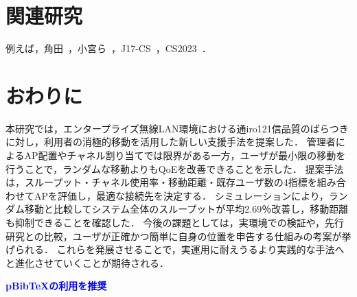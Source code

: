 \documentclass[dvipdfmx,twocolumn]{jsarticle}
\newcommand{\Note}[1]{\noindent \textbf{\textcolor{blue}{#1}}}
\begin{document}

\section{関連研究}
例えば，角田~\cite{角田24}，小宮ら~\cite{小宮24}，J17-CS~\cite{ipsj-csec18:J17-CS}，CS2023~\cite{kumar24:CS2023}．

\section{おわりに}
本研究では，エンタープライズ無線LAN環境における通iro121信品質のばらつきに対し，利用者の消極的移動を活用した新しい支援手法を提案した．
管理者によるAP配置やチャネル割り当てでは限界がある一方，ユーザが最小限の移動を行うことで，ランダムな移動よりもQoEを改善できることを示した．
提案手法は，スループット・チャネル使用率・移動距離・既存ユーザ数の4指標を組み合わせてAPを評価し，最適な接続先を決定する．
シミュレーションにより，ランダム移動と比較してシステム全体のスループットが平均2.69％改善し，移動距離も抑制できることを確認した．
今後の課題としては，実環境での検証や，先行研究との比較，ユーザが正確かつ簡単に自身の位置を申告する仕組みの考案が挙げられる．
これらを発展させることで，実運用に耐えうるより実践的な手法へと進化させていくことが期待される．



\Note{pBibTeXの利用を推奨}
\end{document}

